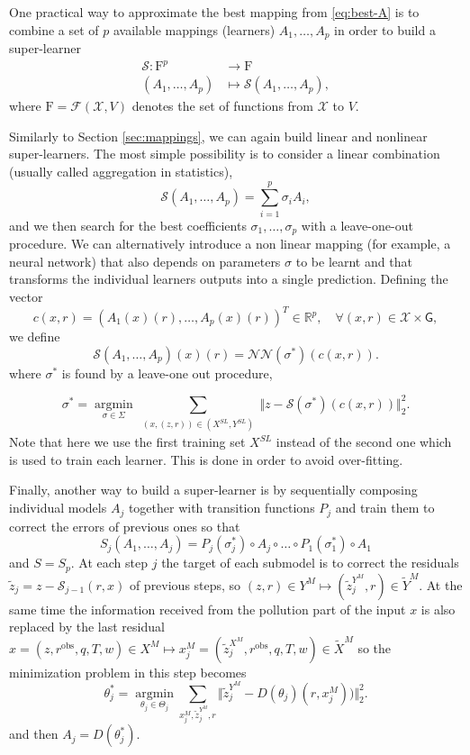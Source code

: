 \documentclass[11pt,a4paper,twoside]{article}
\theoremstyle{definition}
\numberwithin{equation}{section}
\newcommand{\cF}{\ensuremath{\mathcal{F}}}
\newcommand{\cS}{\ensuremath{\mathcal{S}}}
\newcommand{\cX}{\ensuremath{\mathcal{X}}}
\newcommand{\bR}{\ensuremath{\mathbb{R}}}
\newcommand{\rF}{\ensuremath{\mathrm{F}}}
\newcommand{\G}{\ensuremath{\textsf{G}}} %
\newcommand{\<}{\langle}
\renewcommand{\>}{\rangle}
\newcommand{\argmin}{\operatorname{argmin}}
\newcommand{\obs}{\ensuremath{\text{obs}}}
\begin{document}
One practical way to approximate the best mapping from \eqref{eq:best-A} is to combine a set of $p$ available mappings (learners) $A_1, \dots, A_p$ in order to build a super-learner
\begin{align}
\cS: \rF^p &\to \rF \\
( A_1, \dots, A_p) &\mapsto \cS(A_1, \dots, A_p),
\end{align}
where $\rF = \cF(\cX, V)$ denotes the set of functions from $\cX$ to $V$.

Similarly to Section \ref{sec:mappings}, we can again build linear and nonlinear super-learners. The most simple possibility is to consider a linear combination (usually called aggregation in statistics),
$$
\cS(A_1, \dots, A_p) = \sum_{i=1}^p \sigma_i A_i,
$$
and we then search for the best coefficients $\sigma_1, \dots, \sigma_p$ with a leave-one-out procedure. We can alternatively introduce a non linear mapping (for example, a neural network) that also depends on parameters $\sigma$ to be learnt and that transforms the individual learners outputs into a single prediction. Defining the vector
$$
c(x, r) = ( A_1(x)(r), \dots, A_p(x)(r) )^T \in \bR^p, \quad \forall (x,r)\in \cX\times \G,
$$
we define
$$
\cS(A_1, \dots, A_p)(x)(r) =  \mathcal{NN} (\sigma^*)( c(x,r) ).
$$
where $\sigma^*$ is found by a leave-one out procedure,

$$
\sigma^* = \underset{\sigma \in \Sigma}{\argmin}
\sum_{\substack{(x, (z, r))\in (X^{SL}, Y^{SL})}}
\Vert z -  \cS (\sigma^*)( c(x,r) ) \Vert^2_2.
$$
Note that here we use the first training set $X^{SL}$ instead of the second one which is used to train each learner. This is done in order to avoid over-fitting.


Finally, another way to build a super-learner is by sequentially composing individual models $A_j$ together with transition functions $P_j$ and train them to correct the errors of previous ones so that
$$
S_j(A_1, \dots, A_j) = P_j(\sigma_j^*) \circ A_j \circ \dots \circ P_1(\sigma_1^*) \circ A_1
$$
and $S=S_p$. At each step $j$ the target of each submodel is to correct the residuals $\tilde z_j=z - \cS_{j-1}(r, x)$ of previous steps, so $(z, r)\in Y^{M} \mapsto (\tilde z_j^{Y^{M}}, r) \in \tilde Y^{M}$. At the same time the information received from the pollution part of the input $x$ is also replaced by the last residual $x = (z, r^\obs, q, T, w) \in X^{M} \mapsto x_j^M = (\tilde z_j^{X^{M}}, r^\obs, q, T, w) \in \tilde X^{M}$ so the minimization problem in this step becomes
$$
\theta_j^* = \underset{\theta_j \in \Theta_j}{\argmin}
\sum_{x_j^M, \tilde z_j^{Y^{M}}, r}
\Vert \tilde z_j^{Y^{M}} - D(\theta_j)(r, x_j^M)) \Vert^2_2.
$$
and then $A_j=D(\theta_j^*)$.
\end{document}
